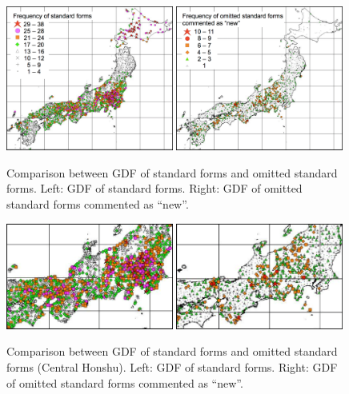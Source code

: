\documentclass[output=paper]{LSP/langsci}
\begin{document}
\begin{figure}
\includegraphics[width=0.49\textwidth]{illustrations/kuma_fig16-a}
\includegraphics[width=0.49\textwidth]{illustrations/kuma_fig16-b}
\caption{Comparison between GDF of standard forms and omitted standard forms. Left: GDF of standard forms. Right: GDF of omitted standard forms commented as “new”.}          
\label{fig:kuma:16}
\end{figure}

\begin{figure}
\includegraphics[width=0.49\textwidth]{illustrations/kuma_fig17-a}
\includegraphics[width=0.49\textwidth]{illustrations/kuma_fig17-b}
\caption{Comparison between GDF of standard forms and omitted standard forms (Central Honshu). Left: GDF of standard forms. Right: GDF of omitted standard forms commented as “new”.}          
\label{fig:kuma:17}
\end{figure}
 
\end{document}
